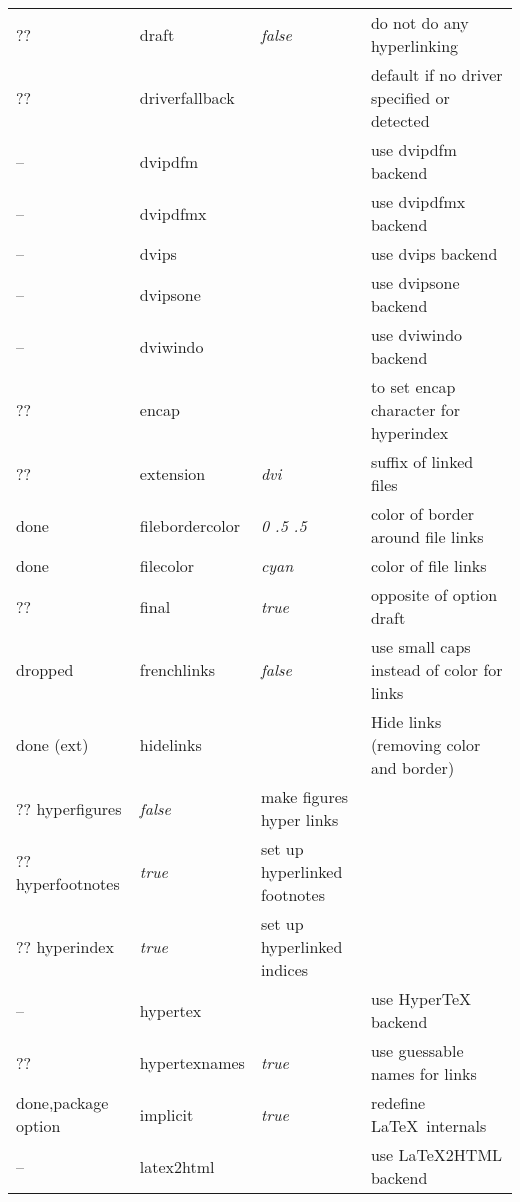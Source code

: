 \begin{longtable}{@{}l>{\ttfamily}llp{7cm}@{}}
??   & draft              & \textit{false}         & do not do any hyperlinking \\
??   & driverfallback     &                        & default if no driver specified or detected\\
--   & dvipdfm            &                        & use \textsf{dvipdfm} backend \\
--   & dvipdfmx           &                        & use \textsf{dvipdfmx} backend \\
--   & dvips              &                        & use \textsf{dvips} backend \\
--   & dvipsone           &                        & use \textsf{dvipsone} backend \\
--   & dviwindo           &                        & use \textsf{dviwindo} backend \\
??   &encap              &                        & to set encap character for hyperindex \\
??   &extension          & \textit{dvi}           & suffix of linked files \\
done &filebordercolor    & \textit{0 .5 .5}       & color of border around file links \\
done &filecolor          & \textit{cyan}          & color of file links \\
??   &final              & \textit{true}          & opposite of option draft \\
dropped &frenchlinks        & \textit{false}         & use small caps instead of color for links \\
done (ext) & hidelinks          &                        & Hide links (removing color and border) \\
?? hyperfigures       & \textit{false}         & make figures hyper links \\
?? hyperfootnotes     & \textit{true}          & set up hyperlinked footnotes \\
?? hyperindex         & \textit{true}          & set up hyperlinked indices \\
-- & hypertex           &                        & use \textsf{Hyper\TeX} backend \\
?? & hypertexnames      & \textit{true}          & use guessable names for links \\
done,package option & implicit           & \textit{true}          & redefine \LaTeX\ internals \\
-- & latex2html         &                        & use \textsf{\LaTeX2HTML} backend \\

\end{longtable}
